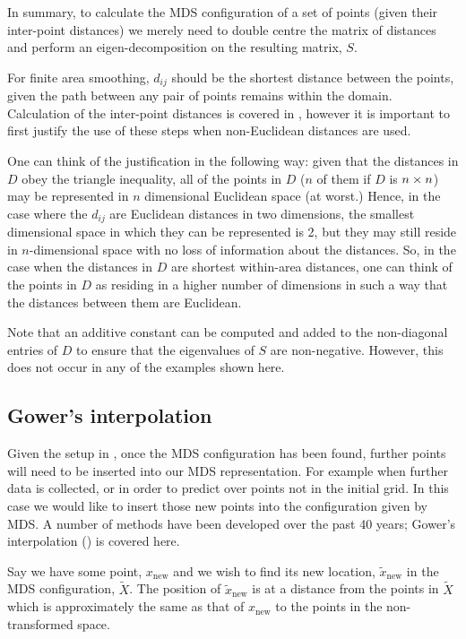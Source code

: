 In summary, to calculate the MDS configuration of a set of points (given their inter-point distances) we merely need to double centre the matrix of distances and perform an eigen-decomposition on the resulting matrix, $S$. 

For finite area smoothing, $d_{ij}$ should be the shortest distance between the points, given the path between any pair of points remains within the domain. Calculation of the inter-point distances is covered in , however it is important to first justify the use of these steps when non-Euclidean distances are used. 

One can think of the justification in the following way: given that the distances in $D$ obey the triangle inequality, all of the points in $D$ ($n$ of them if $D$ is $n \times n$) may be represented in $n$ dimensional Euclidean space (at worst.) Hence, in the case where the $d_{ij}$ are Euclidean distances in two dimensions, the smallest dimensional space in which they can be represented is 2, but they may still reside in $n$-dimensional space with no loss of information about the distances. So, in the case when the distances in $D$ are shortest within-area distances, one can think of the points in $D$ as residing in a higher number of dimensions in such a way that the distances between them are Euclidean.

Note that an additive constant can be computed and added to the non-diagonal entries of $D$ to ensure that the eigenvalues of $S$ are non-negative. However, this does not occur in any of the examples shown here.

\subsection{Gower's interpolation} 
\label{gowers}
Given the setup in , once the MDS configuration has been found, further points will need to be inserted into our MDS representation. For example when further data is collected, or in order to predict over points not in the initial grid. In this case we would like to insert those new points into the configuration given by MDS. A number of methods have been developed over the past 40 years; Gower's interpolation (\cite{gower1968}) is covered here.

Say we have some point, $x_{\text{new}}$ and we wish to find its new location, $\tilde{x}_{\text{new}}$ in the MDS configuration, $\tilde{X}$. The position of $\tilde{x}_{\text{new}}$ is at a distance from the points in $\tilde{X}$ which is approximately the same as that of $x_{\text{new}}$ to the points in the non-transformed space. 

